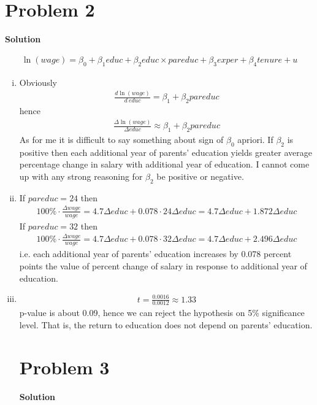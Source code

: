 \documentclass[a4paper]{article}
\begin{document}
\section*{Problem 2}
\textbf{Solution}


\begin{align*}
\ln(wage) = \beta_0 + \beta_1 educ + \beta_2 educ \times pareduc + \beta_3 exper + \beta_4 tenure + u
\end{align*}

\begin{enumerate}[(i)]
	\item Obviously
	\begin{align*}
	\frac{d \ln (wage)}{d\ educ} = \beta_1 + \beta_2 pareduc
	\end{align*}
	hence
	\begin{align*}
	\frac{\Delta \ln (wage)}{\Delta educ} \approx \beta_1 + \beta_2 pareduc
	\end{align*}
	As for me it is difficult to say something about sign of $\beta_0$ apriori. If $\beta_2$ is positive then each additional year of parents' education yields greater average percentage change in salary with additional year of education. I cannot come up with any strong reasoning for $\beta_2$ be positive or negative.
	\item If $pareduc = 24$ then
	\begin{align*}
	100\% \cdot \frac{\Delta wage}{wage} = 4.7 \Delta educ + 0.078 \cdot 24 \Delta educ = 4.7 \Delta educ + 1.872 \Delta educ
	\end{align*}
	If $pareduc = 32$ then
	\begin{align*}
	100\% \cdot \frac{\Delta wage}{wage} = 4.7 \Delta educ + 0.078 \cdot 32 \Delta educ = 4.7 \Delta educ + 2.496 \Delta educ
	\end{align*}
	i.e. each additional year of parents' education increases by 0.078 percent points the value of percent change of salary in response to additional year of education.
	\item \begin{align*}
	t = \frac{0.0016}{0.0012} \approx 1.33
	\end{align*}
	p-value is about 0.09, hence we can reject the hypothesis on 5\% significance level. That is, the return to education does not depend on parents' education.
	\section*{Problem 3}
	
	
	\textbf{Solution}
	

\end{enumerate}
\end{document}
